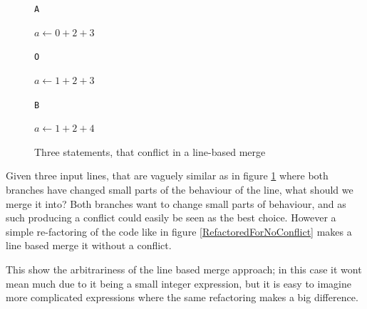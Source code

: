 \documentclass[11pt]{article}
\begin{document}
\begin{figure}

\begin{multicols*}{3}

\texttt{A}

\begin{algorithmic}
	\State $a \gets 0+2+3$
\end{algorithmic}

\columnbreak

\texttt{O}

\begin{algorithmic}
	\State $a \gets 1+2+3$
\end{algorithmic}

\columnbreak

\texttt{B}
 
\begin{algorithmic}
	\State $a \gets 1+2+4$
\end{algorithmic}

\end{multicols*}
\caption{Three statements, that conflict in a line-based merge}
\label{ConflictingLines}

\end{figure}

Given three input lines, that are vaguely similar as in figure \ref{ConflictingLines} where both branches have changed small parts of the behaviour of the line, what should we merge it into? Both branches want to change small parts of behaviour, and as such producing a conflict could easily be seen as the best choice. However a simple re-factoring of the code like in figure \ref{RefactoredForNoConflict} makes a line based merge it without a conflict.

This show the arbitrariness of the line based merge approach; in this case it wont mean much due to it being a small integer expression, but it is easy to imagine more complicated expressions where the same refactoring makes a big difference. 

\end{document}
